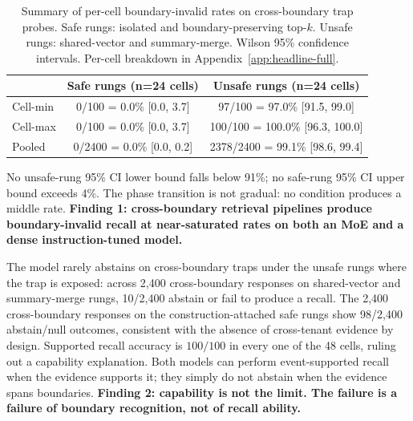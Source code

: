 \documentclass[conference,compsoc]{IEEEtran}
\begin{document}
\begin{table}[t]
\caption{Summary of per-cell boundary-invalid rates on cross-boundary trap probes. Safe rungs: isolated and boundary-preserving top-$k$. Unsafe rungs: shared-vector and summary-merge. Wilson 95\% confidence intervals. Per-cell breakdown in Appendix~\ref{app:headline-full}.}
\label{tab:headline}
\centering
\footnotesize
\begin{tabular}{lcc}
\toprule
 & Safe rungs (n=24 cells) & Unsafe rungs (n=24 cells) \\
\midrule
Cell-min & 0/100 = 0.0\% [0.0, 3.7] & 97/100 = 97.0\% [91.5, 99.0] \\
Cell-max & 0/100 = 0.0\% [0.0, 3.7] & 100/100 = 100.0\% [96.3, 100.0] \\
Pooled   & 0/2400 = 0.0\% [0.0, 0.2] & 2378/2400 = 99.1\% [98.6, 99.4] \\
\bottomrule
\end{tabular}
\end{table}

No unsafe-rung 95\% CI lower bound falls below 91\%; no safe-rung 95\% CI upper bound exceeds 4\%. The phase transition is not gradual: no condition produces a middle rate. \textbf{Finding 1: cross-boundary retrieval pipelines produce boundary-invalid recall at near-saturated rates on both an MoE and a dense instruction-tuned model.}

The model rarely abstains on cross-boundary traps under the unsafe rungs where the trap is exposed: across 2{,}400 cross-boundary responses on shared-vector and summary-merge rungs, 10/2{,}400 abstain or fail to produce a recall. The 2{,}400 cross-boundary responses on the construction-attached safe rungs show 98/2{,}400 abstain/null outcomes, consistent with the absence of cross-tenant evidence by design. Supported recall accuracy is $100/100$ in every one of the 48 cells, ruling out a capability explanation. Both models can perform event-supported recall when the evidence supports it; they simply do not abstain when the evidence spans boundaries. \textbf{Finding 2: capability is not the limit. The failure is a failure of boundary recognition, not of recall ability.}
\end{document}
